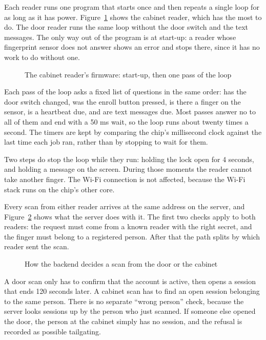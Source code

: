 
Each reader runs one program that starts once and then repeats a single loop for
as long as it has power. Figure~\ref{fig:firmware} shows the cabinet reader,
which has the most to do. The door reader runs the same loop without the door
switch and the text messages. The only way out of the program is at start-up:
a reader whose fingerprint sensor does not answer shows an error and stops
there, since it has no work to do without one.

\begin{figure}[H]
\centering
\caption{The cabinet reader's firmware: start-up, then one pass of the loop}
\label{fig:firmware}

\end{figure}

Each pass of the loop asks a fixed list of questions in the same order: has the
door switch changed, was the enroll button pressed, is there a finger on the
sensor, is a heartbeat due, and are text messages due. Most passes answer no to
all of them and end with a 50 ms wait, so the loop runs about twenty times a
second. The timers are kept by comparing the chip's millisecond clock against
the last time each job ran, rather than by stopping to wait for them.

Two steps do stop the loop while they run: holding the lock open for 4 seconds,
and holding a message on the screen. During those moments the reader cannot take
another finger. The Wi-Fi connection is not affected, because the Wi-Fi stack
runs on the chip's other core.


Every scan from either reader arrives at the same address on the server, and
Figure~\ref{fig:backend} shows what the server does with it. The first two
checks apply to both readers: the request must come from a known reader with
the right secret, and the finger must belong to a registered person. After that
the path splits by which reader sent the scan.

\begin{figure}[H]
\centering
\caption{How the backend decides a scan from the door or the cabinet}
\label{fig:backend}

\end{figure}

A door scan only has to confirm that the account is active, then opens a
session that ends 120 seconds later. A cabinet scan has to find an open session
belonging to the same person. There is no separate ``wrong person'' check,
because the server looks sessions up by the person who just scanned. If someone
else opened the door, the person at the cabinet simply has no session, and the
refusal is recorded as possible tailgating.

